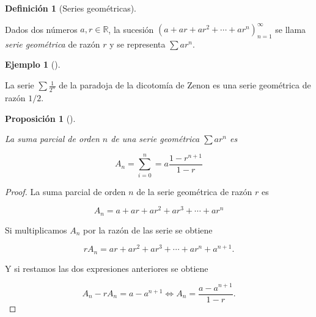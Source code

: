 \documentclass[
  a4paper,
]{scrreport}
\theoremstyle{definition}
\newtheorem{example}{Ejemplo}[chapter]
\theoremstyle{plain}
\theoremstyle{definition}
\newtheorem{definition}{Definición}[chapter]
\theoremstyle{definition}
\theoremstyle{plain}
\theoremstyle{plain}
\newtheorem{proposition}{Proposición}[chapter]
\theoremstyle{remark}
\begin{document}
\begin{definition}[Series
geométricas]\protect\hypertarget{def-serie-geometrica}{}\label{def-serie-geometrica}

Dados dos números \(a, r\in\mathbb{R}\), la sucesión
\((a+ar+ar^{2}+\cdots+ar^{n})_{n=1}^\infty\) se llama \emph{serie
geométrica} de razón \(r\) y se representa \(\sum ar^n\).

\end{definition}

\begin{example}[]\protect\hypertarget{exm-serie-geometrica}{}\label{exm-serie-geometrica}

La serie \(\sum \frac{1}{2^n}\) de la paradoja de la dicotomía de Zenon
es una serie geométrica de razón \(1/2\).

\end{example}

\begin{proposition}[]\protect\hypertarget{prp-suma-parcial-serie-geometrica}{}\label{prp-suma-parcial-serie-geometrica}

La suma parcial de orden \(n\) de una serie geométrica \(\sum ar^n\) es

\[
A_n = \sum_{i=0}^n = a\frac{1-r^{n+1}}{1-r}
\]

\end{proposition}

\begin{tcolorbox}[enhanced jigsaw, leftrule=.75mm, colbacktitle=quarto-callout-note-color!10!white, toprule=.15mm, opacityback=0, opacitybacktitle=0.6, toptitle=1mm, breakable, bottomtitle=1mm, colframe=quarto-callout-note-color-frame, rightrule=.15mm, titlerule=0mm, title=\textcolor{quarto-callout-note-color}{\faInfo}\hspace{0.5em}{Demostración}, arc=.35mm, left=2mm, bottomrule=.15mm, colback=white, coltitle=black]

\begin{proof}
La suma parcial de orden \(n\) de la serie geométrica de razón \(r\) es

\[
A_n = a + ar + ar^2 + ar^3 + \cdots + ar^n
\]

Si multiplicamos \(A_n\) por la razón de las serie se obtiene

\[
rA_n = ar + ar^2 + ar^3 + \cdots + ar^n + a^{n+1}.
\]

Y si restamos las dos expresiones anteriores se obtiene

\[
A_n-rA_n = a - a^{n+1} \Leftrightarrow A_n = \frac{a-a^{n+1}}{1-r}.
\]
\end{proof}

\end{tcolorbox}
\end{document}
